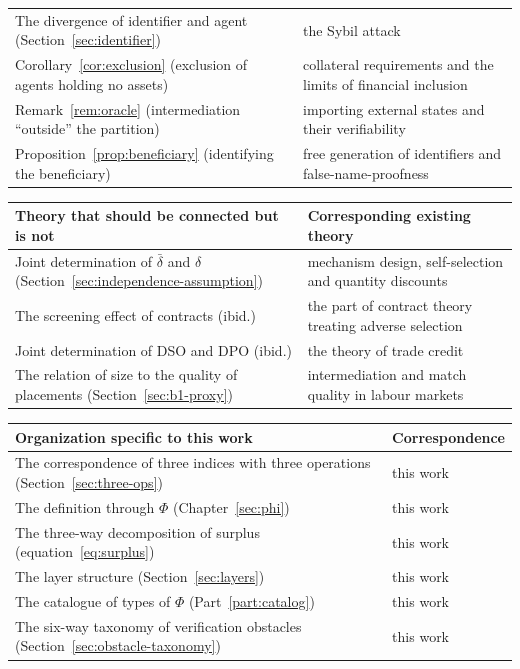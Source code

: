 \begin{longtable}{@{}>{\raggedright\arraybackslash}p{}>{\raggedright\arraybackslash}p{}@{}}
The divergence of identifier and agent (Section~\ref{sec:identifier}) & the Sybil attack \cite{douceur2002} \\
Corollary~\ref{cor:exclusion} (exclusion of agents holding no assets) & collateral requirements and the limits of financial inclusion \cite{oecd2024} \\
Remark~\ref{rem:oracle} (intermediation ``outside'' the partition) & importing external states and their verifiability \cite{pasdar2023} \\
Proposition~\ref{prop:beneficiary} (identifying the beneficiary) & free generation of identifiers and false-name-proofness \cite{yokoo2004} \\
\end{longtable}

\begin{center}
\begin{tabularx}{\textwidth}{@{}XX@{}}
\toprule
Theory that should be connected but is not & Corresponding existing theory \\
\midrule
Joint determination of $\bar\delta$ and $\delta$ (Section~\ref{sec:independence-assumption}) & mechanism design, self-selection and quantity discounts \\
The screening effect of contracts (ibid.) & the part of contract theory treating adverse selection \\
Joint determination of DSO and DPO (ibid.) & the theory of trade credit \\
The relation of size to the quality of placements (Section~\ref{sec:b1-proxy}) & intermediation and match quality in labour markets \\
\bottomrule
\end{tabularx}
\label{tab:priorwork-layer3b}
\end{center}

\begin{center}
\begin{tabularx}{\textwidth}{@{}XX@{}}
\toprule
Organization specific to this work & Correspondence \\
\midrule
The correspondence of three indices with three operations (Section~\ref{sec:three-ops}) & this work \\
The definition through $\Phi$ (Chapter~\ref{sec:phi}) & this work \\
The three-way decomposition of surplus (equation~\eqref{eq:surplus}) & this work \\
The layer structure (Section~\ref{sec:layers}) & this work \\
The catalogue of types of $\Phi$ (Part~\ref{part:catalog}) & this work \\
The six-way taxonomy of verification obstacles (Section~\ref{sec:obstacle-taxonomy}) & this work \\
\bottomrule
\end{tabularx}
\label{tab:priorwork-layer3c}
\end{center}

